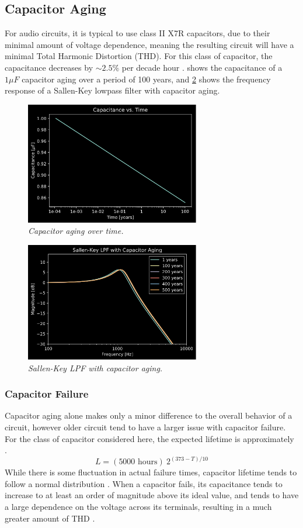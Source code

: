 \documentclass[twoside,a4paper]{article}
\begin{document}
\subsection{Capacitor Aging} \label{sec:cap-age}
%
For audio circuits, it is typical to use class II X7R capacitors, due to
their minimal amount of voltage dependence, meaning the resulting circuit
will have a minimal Total Harmonic Distortion (THD). For this class of
capacitor, the capacitance decreases by $\sim2.5\%$ per decade hour
\cite{cap-aging}.  shows the capacitance of a $1 \mu F$
capacitor aging over a period of 100 years, and \cref{cap-age-freq} shows
the frequency response of a Sallen-Key lowpass filter with capacitor
aging.
%
\begin{figure}[!htb]
    \center
    \includegraphics[width=3in]{../CMAging/Pics/cap_time.png}
    \caption{\label{cap-age}{\it Capacitor aging over time.}}
\end{figure}
%
\begin{figure}[!htb]
    \center
    \includegraphics[width=3in]{../CMAging/Pics/cap_freq.png}
    \caption{\label{cap-age-freq}{\it Sallen-Key LPF with capacitor aging.}}
\end{figure}
%
\subsubsection{Capacitor Failure} \label{sec:cap-fail}
%
Capacitor aging alone makes only a minor difference to the overall
behavior of a circuit, however older circuit tend to have a larger
issue with capacitor failure. For the class of capacitor considered
here, the expected lifetime is approximately \cite{cap-fail}.
%
\begin{equation}
    L = (5000 \text{ hours})\ 2^{(373 - T) / 10}
    \label{eq:cap-fail}
\end{equation}
%
While there is some fluctuation in actual failure times, capacitor
lifetime tends to follow a normal distribution \cite{cap-fail}. When
a capacitor fails, its capacitance tends to increase to at least an
order of magnitude above its ideal value, and tends to have a large
dependence on the voltage across its terminals, resulting in a much
greater amount of THD \cite{cap-fail}.
%
\end{document}
